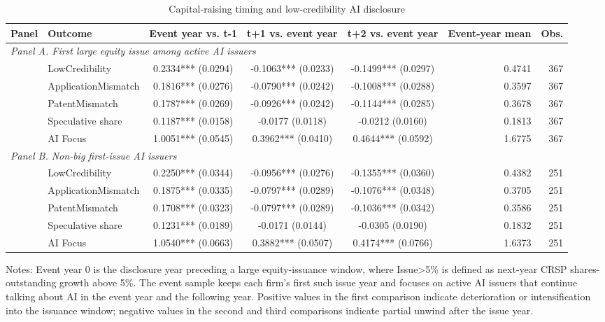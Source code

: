 \begin{table}[!htbp]
\centering
\caption{Capital-raising timing and low-credibility AI disclosure}
\label{tab:capital_raising_timing_v32}
\small
\begin{tabular}{llcccrr}
\hline
Panel & Outcome & Event year vs. t-1 & t+1 vs. event year & t+2 vs. event year & Event-year mean & Obs. \\
\hline
\multicolumn{7}{l}{\textit{Panel A. First large equity issue among active AI issuers}} \\
 & LowCredibility & 0.2334*** (0.0294) & -0.1063*** (0.0233) & -0.1499*** (0.0297) & 0.4741 & 367 \\
 & ApplicationMismatch & 0.1816*** (0.0276) & -0.0790*** (0.0242) & -0.1008*** (0.0288) & 0.3597 & 367 \\
 & PatentMismatch & 0.1787*** (0.0269) & -0.0926*** (0.0242) & -0.1144*** (0.0285) & 0.3678 & 367 \\
 & Speculative share & 0.1187*** (0.0158) & -0.0177 (0.0118) & -0.0212 (0.0160) & 0.1813 & 367 \\
 & AI Focus & 1.0051*** (0.0545) & 0.3962*** (0.0410) & 0.4644*** (0.0592) & 1.6775 & 367 \\
\multicolumn{7}{l}{\textit{Panel B. Non-big first-issue AI issuers}} \\
 & LowCredibility & 0.2250*** (0.0344) & -0.0956*** (0.0276) & -0.1355*** (0.0360) & 0.4382 & 251 \\
 & ApplicationMismatch & 0.1875*** (0.0335) & -0.0797*** (0.0289) & -0.1076*** (0.0348) & 0.3705 & 251 \\
 & PatentMismatch & 0.1708*** (0.0323) & -0.0797*** (0.0289) & -0.1036*** (0.0342) & 0.3586 & 251 \\
 & Speculative share & 0.1231*** (0.0189) & -0.0171 (0.0144) & -0.0305 (0.0190) & 0.1832 & 251 \\
 & AI Focus & 1.0540*** (0.0663) & 0.3882*** (0.0507) & 0.4174*** (0.0766) & 1.6373 & 251 \\
\hline
\end{tabular}
\begin{flushleft}
\footnotesize Notes: Event year 0 is the disclosure year preceding a large equity-issuance window, where Issue>5\% is defined as next-year CRSP shares-outstanding growth above 5\%. The event sample keeps each firm's first such issue year and focuses on active AI issuers that continue talking about AI in the event year and the following year. Positive values in the first comparison indicate deterioration or intensification into the issuance window; negative values in the second and third comparisons indicate partial unwind after the issue year.
\end{flushleft}
\end{table}
